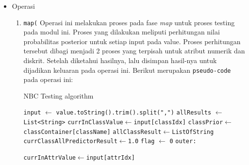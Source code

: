 \begin{enumerate}
\begin{itemize}
\begin{enumerate}
		\end{enumerate}
		
		\item{Operasi}
		\begin{enumerate}
			\item{\texttt{map(}}
			Operasi ini melakukan proses pada fase \textit{map} untuk proses testing pada modul ini. Proses yang dilakukan meliputi perhitungan nilai probabilitas posterior untuk setiap input pada value. Proses perhitungan tersebut dibagi menjadi 2 proses yang terpisah untuk atribut numerik dan diskrit. Setelah diketahui hasilnya, lalu disimpan hasil-nya untuk dijadikan keluaran pada operasi ini. Berikut merupakan \texttt{pseudo-code} pada operasi ini:
			\begin{algorithm}[H]
			\caption{NBC Testing algorithm}\label{alg:NBCTestMap}
			\begin{algorithmic}[1]
			\State \texttt{input} $\gets$ \texttt{value.toString().trim().split(",")}
			\State \texttt{allResults} $\gets$ \texttt{List<String>}
				\State \texttt{currInClassValue}$ \gets $\texttt{input[classIdx]}
				\State \texttt{classPrior}$ \gets $\texttt{classContainer[className]}
				\State \texttt{allClassResult}$ \gets $\texttt{ListOfString}
					\State \texttt{currClassAllPredictorResult}$ \gets $\texttt{1.0}
					\State \texttt{flag} $\gets$ \texttt{0}
					\State \texttt{outer:}
					
						\State \texttt{currInAttrValue}$ \gets $\texttt{input[attrIdx]}	
						

\end{algorithmic}
\end{algorithm}
\end{enumerate}
\end{itemize}
\end{enumerate}
